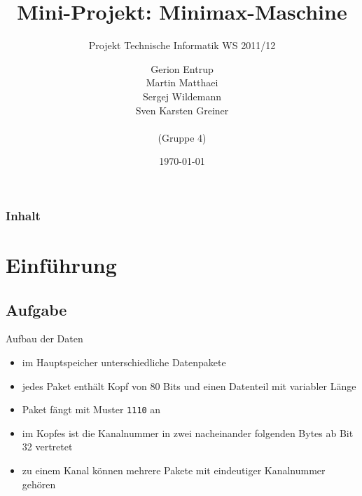 \documentclass{beamer}
\title{Mini-Projekt: Minimax-Maschine}
\subtitle{Projekt Technische Informatik WS 2011/12}
\author{Gerion Entrup\\ Martin Matthaei\\ Sergej Wildemann\\ Sven Karsten Greiner\\ \\ (Gruppe 4)}
\date{\today}
\begin{document}
\begin{frame}
\titlepage
\end{frame}



\begin{frame}
\frametitle{Inhalt}
{
    \setcounter{tocdepth}{2}
    \tableofcontents %
}
\end{frame}



\section{Einführung}

\subsection{Aufgabe}



\begin{frame}{Aufbau der Daten}

\begin{itemize}[<+->]
    \item im Hauptspeicher unterschiedliche Datenpakete
    \item jedes Paket enthält Kopf von 80 Bits und einen Datenteil mit variabler Länge
    \item Paket fängt mit Muster \texttt{1110} an
    \item im Kopfes ist die Kanalnummer in zwei nacheinander folgenden Bytes ab Bit 32 vertretet
    \item zu einem Kanal können mehrere Pakete mit eindeutiger Kanalnummer gehören
\end{itemize}

\end{frame}
\end{document}
